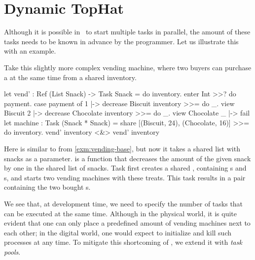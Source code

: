 
\section{Dynamic TopHat}
\label{sec:dyntophat}


Although it is possible in \TOPHAT\ to start multiple tasks in parallel,
the amount of these tasks needs to be known in advance by the programmer.
Let us illustrate this with an example.

\begin{example}
  \label{exm:vending-shared}
  Take this slightly more complex vending machine,
  where two buyers can purchase a  at the same time from a shared inventory.

  \begin{TASK}[emph={inventory,payment}]
    let vend' : Ref (List Snack) -> Task Snack = do inventory.
      enter Int >>? do payment.
      case payment of
        1 |-> decrease Biscuit inventory >>= do _.
             view Biscuit
        2 |-> decrease Chocolate inventory >>= do _.
             view Chocolate
        _ |-> fail
    let machine : Task (Snack * Snack) =
      share [(Biscuit, 24), (Chocolate, 16)] >>= do inventory.
      vend' inventory <&> vend' inventory
  \end{TASK}

  Here  is similar to  from \cref{exm:vending-base},
  but now it takes a shared list with snacks as a parameter.
   is a function that decreases the amount of the given snack by one in the shared list of snacks.
  Task  first creates a shared ,
  containing s and s,
  and starts two vending machines with these treats.
  This task results in a pair containing the two bought s.
\end{example}

We see that, at development time, we need to specify the number of  tasks that can be executed at the same time.
Although in the physical world, it is quite evident that one can only place a predefined amount of vending machines next to each other;
in the digital world, one would expect to initialize and kill such processes at any time.
To mitigate this shortcoming of \TOPHAT, we extend it with \emph{task pools}.


